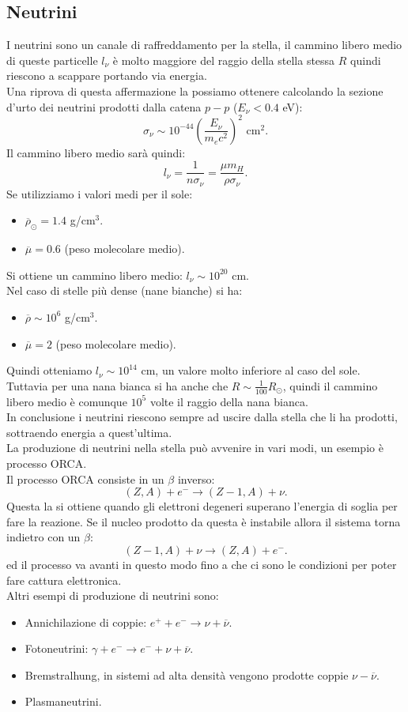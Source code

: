 \subsection{Neutrini}%
\label{sub:Neutrini}
I neutrini sono un canale di raffreddamento per la stella, il cammino libero medio di queste particelle $l_\nu$ è molto maggiore del raggio della stella stessa $R$  quindi riescono a scappare portando via energia.\\
Una riprova di questa affermazione la possiamo ottenere calcolando la sezione d'urto dei neutrini prodotti dalla catena $p-p$ ($E_\nu < 0.4$ eV):
\[
    \sigma_\nu  \sim 
    10^{-44}
    \left(\frac{E_\nu}{m_ec^2}\right)^2 
    \text{ cm}^2
.\] 
Il cammino libero medio sarà quindi:
\[
    l_\nu =
    \frac{1}{n\sigma_\nu} =
    \frac{\mu m_H}{\rho\sigma_\nu}
.\] 
Se utilizziamo i valori medi per il sole:
\begin{itemize}
    \item $\overline{\rho }_\odot = 1.4$ g/cm$^3$.
    \item $\overline{\mu} = 0.6$ (peso molecolare medio).
\end{itemize}
Si ottiene un cammino libero medio: $l_\nu  \sim 10^{20}$ cm.\\
Nel caso di stelle più dense (nane bianche) si ha:
\begin{itemize}
    \item $\overline{\rho} \sim 10^6$ g/cm$^3$.
    \item $\overline{\mu} = 2$ (peso molecolare medio).
\end{itemize}
Quindi otteniamo $l_\nu  \sim 10^{14}$ cm, un valore molto inferiore al caso del sole. Tuttavia per una nana bianca si ha anche che $R\sim \frac{1}{100}R_\odot$, quindi il cammino libero medio è comunque $10^5$ volte il raggio della nana bianca.\\
In conclusione i neutrini riescono sempre ad uscire dalla stella che li ha prodotti, sottraendo energia a quest'ultima.\\
La produzione di neutrini nella stella può avvenire in vari modi, un esempio è processo ORCA.\\
Il processo ORCA consiste in un $\beta$ inverso:
\[
    \left(Z,A\right)+e^- \to \left(Z-1,A\right)+\nu
.\] 
Questa la si ottiene quando gli elettroni degeneri superano l'energia di soglia per fare la reazione. Se il nucleo prodotto da questa è instabile allora il sistema torna indietro con un $\beta$:
\[
    \left(Z-1,A\right) +\nu  \to \left(Z,A\right)+e^-
.\] 
ed il processo va avanti in questo modo fino a che ci sono le condizioni per poter fare cattura elettronica.\\
Altri esempi di produzione di neutrini sono:
\begin{itemize}
    \item Annichilazione di coppie: $e^+ + e^- \to \nu  + \overline{\nu}$.
    \item Fotoneutrini: $\gamma + e^- \to e^- + \nu  + \overline{\nu}$.
    \item Bremstralhung, in sistemi ad alta densità vengono prodotte coppie $\nu - \overline{\nu}$.
    \item Plasmaneutrini.
\end{itemize}
